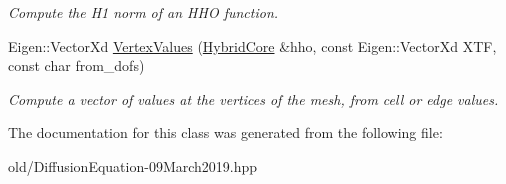 \begin{DoxyCompactItemize}
\begin{DoxyCompactList}\small\item\em Compute the H1 norm of an H\+HO function. \end{DoxyCompactList}\item 
\mbox{\label{classMeshFramework2D_1_1DiffusionEquation_a6edd31761a67a9664469bb5771f15f16}} 
Eigen\+::\+Vector\+Xd \hyperlink{classMeshFramework2D_1_1DiffusionEquation_a6edd31761a67a9664469bb5771f15f16}{Vertex\+Values} (\hyperlink{classMeshFramework2D_1_1HybridCore}{Hybrid\+Core} \&hho, const Eigen\+::\+Vector\+Xd X\+TF, const char from\+\_\+dofs)
\begin{DoxyCompactList}\small\item\em Compute a vector of values at the vertices of the mesh, from cell or edge values. \end{DoxyCompactList}\end{DoxyCompactItemize}


The documentation for this class was generated from the following file\+:\begin{DoxyCompactItemize}
\item 
old/Diffusion\+Equation-\/09\+March2019.\+hpp\end{DoxyCompactItemize}
